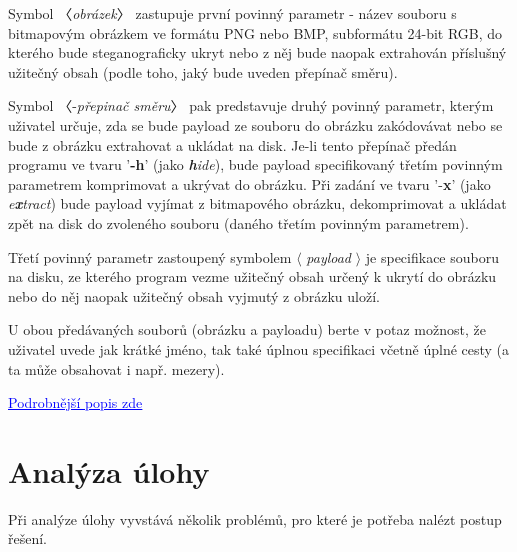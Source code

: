 \documentclass[12pt]{report}
\begin{document}
    Symbol 〈\textit{obrázek}〉 zastupuje první povinný parametr - název souboru s bitmapovým obrázkem ve formátu PNG nebo BMP, subformátu 24-bit RGB, do kterého bude steganograficky ukryt nebo
    z něj bude naopak extrahován příslušný užitečný obsah (podle toho, jaký bude uveden přepínač směru).

    Symbol 〈-\textit{přepinač směru}〉 pak predstavuje druhý povinný parametr, kterým uživatel určuje, zda se bude payload ze souboru do obrázku zakódovávat nebo se bude z obrázku extrahovat a ukládat na disk. Je-li tento přepínač předán programu ve tvaru '\textbf{-h}' (jako\textit{ \textbf{h}ide}), bude payload specifikovaný třetím povinným parametrem komprimovat a ukrývat do obrázku. Při zadání ve tvaru '-\textbf{x}' (jako \textit{e\textbf{x}tract}) bude payload vyjímat z bitmapového obrázku, dekomprimovat a ukládat zpět na disk do zvoleného souboru (daného třetím povinným parametrem).

    Třetí povinný parametr zastoupený symbolem $\langle$ \textit{payload} $\rangle$ je specifikace souboru na disku, ze kterého program vezme užitečný obsah určený k ukrytí do obrázku nebo do něj naopak užitečný obsah vyjmutý z obrázku uloží.

    U obou předávaných souborů (obrázku a payloadu) berte v potaz možnost, že uživatel uvede jak krátké jméno, tak také úplnou specifikaci včetně úplné cesty (a ta může obsahovat i např. mezery).

    \href{https://www.kiv.zcu.cz/studies/predmety/pc/data/works/sw2023-02.pdf}{\textcolor{blue}{\underline{Podrobnější popis zde}}}



    \chapter{Analýza úlohy}
    Při analýze úlohy vyvstává několik problémů, pro které je potřeba nalézt postup řešení.
\end{document}
